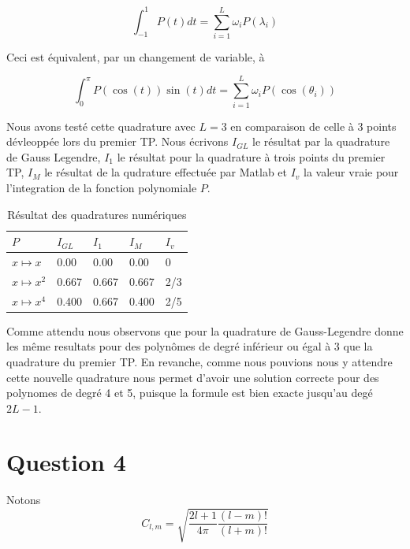 \documentclass[10pt]{article}
\begin{document}
\begin{multicols}{2}
\begin{equation}
	\int_{-1}^{1}{P(t)dt} = \sum_{i=1}^{L}{\omega_i P(\lambda_i)}
\end{equation}

Ceci est équivalent, par un changement de variable, à

\begin{equation}
	\int_{0}^{\pi}{P(\cos(t))\sin(t)dt} = \sum_{i=1}^{L}{\omega_i P(\cos(\theta_i))}
\end{equation}

Nous avons testé cette quadrature avec $L = 3$ en comparaison de celle à 3 points dévleoppée lors du premier TP. Nous écrivons $I_{GL}$ le résultat par la quadrature de Gauss Legendre, $I_{1}$ le résultat pour la quadrature à trois points du premier TP, $I_{M}$ le résultat de la qudrature effectuée par Matlab et $I_v$ la valeur vraie pour l'integration de la fonction polynomiale $P$.

\begin{table}[H]
\centering
\begin{tabular}{m{2cm} |m{1cm} m{1cm} m{1cm} m{1cm}} 
   \hline
    \centering $P$ & $I_{GL}$ & $I_{1}$ & $I_{M}$ & $I_v$ \\
    \toprule
    \toprule
    $x \mapsto x$      & 0.00 & 0.00 & 0.00 & 0 \\
    $x \mapsto x^{2}$  & 0.667 & 0.667 & 0.667 & 2/3 \\
    $x \mapsto x^{4}$  & 0.400 & 0.667 & 0.400 & 2/5 \\
    \hline
\end{tabular}
\caption{Résultat des quadratures numériques}
\end{table}

Comme attendu nous observons que pour la quadrature de Gauss-Legendre donne les même resultats pour des polynômes de degré inférieur ou égal à 3 que la quadrature du premier TP. En revanche, comme nous pouvions nous y attendre cette nouvelle quadrature nous permet d'avoir une solution correcte pour des polynomes de degré 4 et 5, puisque la formule est bien exacte jusqu'au degé $2L-1$.


\vspace*{12pt}

\section*{Question 4}

Notons 
\begin{equation}
	C_{l,m} = \sqrt{\frac{2l+1}{4\pi}\frac{(l-m)!}{(l+m)!}}
\end{equation}


\end{multicols}
\end{document}
